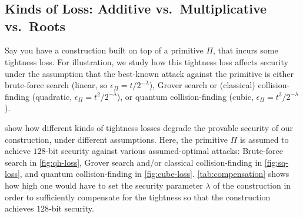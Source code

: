 \section{\titleTightness}\label{sec:tightness}


  \subsection{Kinds of Loss: Additive vs.\ Multiplicative vs.\ Roots}
    Say you have a construction built on top of a primitive $\Pi$, that incurs
      some tightness loss. For illustration, we study how this tightness loss
      affects security under the assumption that the best-known attack against
      the primitive is either brute-force search (linear, so $\epsilon_\Pi =
      t/{2^{-\lambda}}$), Grover search or (classical) collision-finding
      (quadratic, $\epsilon_\Pi = t^2/2^{-\lambda}$), or quantum
      collision-finding (cubic, $\epsilon_\Pi = t^3/2^{-\lambda}$). 

     show how different kinds of tightness
      losses degrade the provable security of our construction, under different
      assumptions. Here, the primitive $\Pi$ is assumed to achieve
      $128$-bit security against various assumed-optimal attacks: 
      Brute-force search in \cref{fig:qh-loss},
      Grover search and/or classical collision-finding in \cref{fig:sq-loss},
      and quantum collision-finding in \cref{fig:cube-loss}.
      \cref{tab:compensation} shows how high one would have to set the security
      parameter $\lambda$ of the construction in order to sufficiently
      compensate for the tightness so that the construction achieves $128$-bit
      security.

